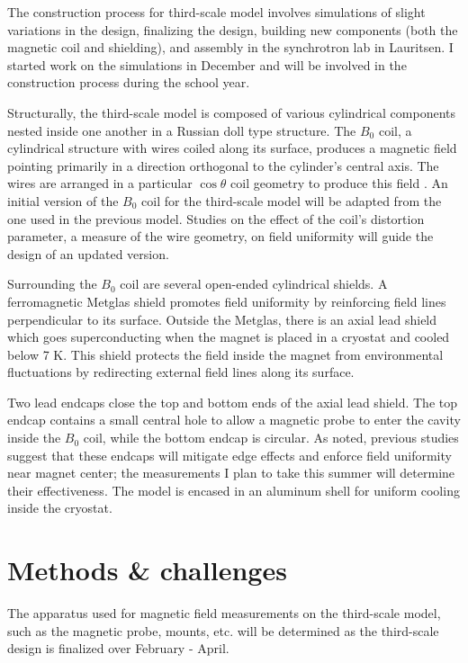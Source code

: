 \documentclass[twocolumn,aps,prb,citeautoscript]{revtex4-1}
\begin{document}
The construction process for third-scale model involves simulations of slight variations in the design,
finalizing the design, building new components (both the magnetic coil and shielding),
and assembly in the synchrotron lab in Lauritsen. I started work on the simulations in December
and will be involved in the construction process during the school year.

Structurally, the third-scale model is composed of various cylindrical components nested inside one another
in a Russian doll type structure.
The $B_0$ coil, a cylindrical structure with wires coiled along its surface, produces a magnetic field pointing
primarily in a direction orthogonal to the cylinder's central axis. The wires are arranged in a particular
$\cos\theta$ coil geometry to produce this field \cite{coil}. An initial version of the $B_0$ coil for the third-scale
model will be adapted from the one used in the previous model. Studies on the effect of the coil's distortion
parameter, a measure of the wire geometry, on field uniformity will guide the design of an updated version.

Surrounding the $B_0$ coil are several open-ended cylindrical shields.
A ferromagnetic Metglas shield promotes field uniformity
by reinforcing field lines perpendicular to its surface. Outside the Metglas, there is an axial lead shield which
goes superconducting when the magnet is placed in a cryostat and cooled below 7 K. This shield protects the
field inside the magnet from environmental fluctuations by redirecting external field lines along its surface.

Two lead endcaps close the top and bottom ends of the axial lead shield. The top endcap contains a small
central hole to allow
a magnetic probe to enter the cavity inside the $B_0$ coil, while the bottom endcap is circular. As noted,
previous studies suggest that these endcaps will mitigate edge effects and enforce field uniformity near
magnet center; the measurements I plan to take this summer will determine their effectiveness. The model is encased
in an aluminum shell for uniform cooling inside the cryostat.

\section{Methods \& challenges}

The apparatus used for magnetic field measurements on the third-scale model, such as the magnetic probe,
mounts, etc. will be determined as the third-scale design is finalized over February - April.
\end{document}
